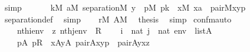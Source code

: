 \begin{isabellebody}
\ simp\isanewline
\ \ \isamarkupfalse%
\isanewline
\ \ \isamarkupfalse%
\ {\isachardoublequoteopen}{\isasymforall}k{\isasymin}M{\isachardot}{\kern0pt}\ {\isasymforall}a{\isasymin}M{\isachardot}{\kern0pt}\ separation{\isacharparenleft}{\kern0pt}{\isacharhash}{\kern0pt}{\isacharhash}{\kern0pt}M{\isacharcomma}{\kern0pt}\ {\isasymlambda}y\ {\isachardot}{\kern0pt}\ {\isasymexists}p{\isasymin}M{\isachardot}{\kern0pt}\ p{\isasymin}k\ {\isacharampersand}{\kern0pt}\ {\isacharparenleft}{\kern0pt}{\isasymexists}x{\isasymin}M{\isachardot}{\kern0pt}\ x{\isasymin}a\ {\isacharampersand}{\kern0pt}\ pair{\isacharparenleft}{\kern0pt}{\isacharhash}{\kern0pt}{\isacharhash}{\kern0pt}M{\isacharcomma}{\kern0pt}x{\isacharcomma}{\kern0pt}y{\isacharcomma}{\kern0pt}p{\isacharparenright}{\kern0pt}{\isacharparenright}{\kern0pt}{\isacharparenright}{\kern0pt}{\isachardoublequoteclose}\isanewline
\ \ \ \ \isamarkupfalse%
\ separation{\isacharunderscore}{\kern0pt}def\ \isamarkupfalse%
\ simp\isanewline
\ \ \isamarkupfalse%
\ {\isacartoucheopen}r{\isasymin}M{\isacartoucheclose}\ {\isacartoucheopen}A{\isasymin}M{\isacartoucheclose}\ \isamarkupfalse%
\ {\isacharquery}{\kern0pt}thesis\ \isamarkupfalse%
\ simp\isanewline
{}\isamarkupfalse%
%
\endisatagproof
{\isafoldproof}%
%
\isadelimproof
\isanewline
%
\endisadelimproof
\isanewline
{}\isamarkupfalse%
\ con{\isacharunderscore}{\kern0pt}fm{\isacharunderscore}{\kern0pt}auto{\isacharcolon}{\kern0pt}\isanewline
\ \ \isanewline
\ \ \ \ {\isachardoublequoteopen}nth{\isacharparenleft}{\kern0pt}i{\isacharcomma}{\kern0pt}env{\isacharparenright}{\kern0pt}\ {\isacharequal}{\kern0pt}\ z{\isachardoublequoteclose}\ {\isachardoublequoteopen}nth{\isacharparenleft}{\kern0pt}j{\isacharcomma}{\kern0pt}env{\isacharparenright}{\kern0pt}\ {\isacharequal}{\kern0pt}\ R{\isachardoublequoteclose}\isanewline
\ \ \ \ {\isachardoublequoteopen}i\ {\isasymin}\ nat{\isachardoublequoteclose}\ {\isachardoublequoteopen}j\ {\isasymin}\ nat{\isachardoublequoteclose}\ {\isachardoublequoteopen}env\ {\isasymin}\ list{\isacharparenleft}{\kern0pt}A{\isacharparenright}{\kern0pt}{\isachardoublequoteclose}\isanewline
\ \ \isanewline
\ \ \ \ {\isachardoublequoteopen}{\isacharparenleft}{\kern0pt}{\isasymexists}p{\isasymin}A{\isachardot}{\kern0pt}\ p{\isasymin}R\ {\isacharampersand}{\kern0pt}\ {\isacharparenleft}{\kern0pt}{\isasymexists}x{\isasymin}A{\isachardot}{\kern0pt}{\isasymexists}y{\isasymin}A{\isachardot}{\kern0pt}\ pair{\isacharparenleft}{\kern0pt}{\isacharhash}{\kern0pt}{\isacharhash}{\kern0pt}A{\isacharcomma}{\kern0pt}x{\isacharcomma}{\kern0pt}y{\isacharcomma}{\kern0pt}p{\isacharparenright}{\kern0pt}\ {\isacharampersand}{\kern0pt}\ pair{\isacharparenleft}{\kern0pt}{\isacharhash}{\kern0pt}{\isacharhash}{\kern0pt}A{\isacharcomma}{\kern0pt}y{\isacharcomma}{\kern0pt}x{\isacharcomma}{\kern0pt}z{\isacharparenright}{\kern0pt}{\isacharparenright}{\kern0pt}{\isacharparenright}{\kern0pt}\isanewline

\end{isabellebody}
